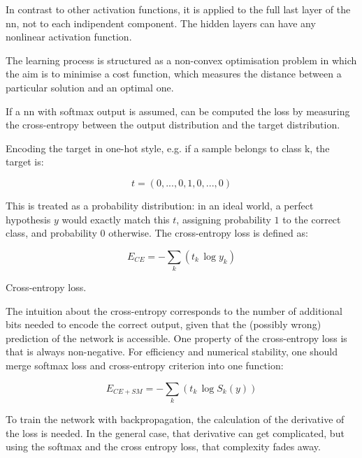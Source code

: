 \noindent In contrast to other activation functions, it is applied to the full last layer of the \gls{nn}, not to each indipendent component. The hidden layers can have any nonlinear activation function.

\noindent The learning process is structured as a non-convex optimisation problem in which the aim is to minimise a cost function, which measures the distance between a particular solution and an optimal one.

\noindent If a \gls{nn} with softmax output is assumed, can be computed the loss by measuring the cross-entropy between the output distribution and the target distribution.

\noindent Encoding the target in one-hot style, e.g. if a sample belongs to class k, the target is:

\begin{Equation}[H]
	\centering
	\begin{equation} \label{eq:nnclass3}
		t=(0,...,0,1,0,...,0)
	\end{equation}
\end{Equation}

\noindent This is treated as a probability distribution: in an ideal world, a perfect hypothesis $y$ would exactly match this $t$, assigning probability $1$ to the correct class, and probability $0$ otherwise. The cross-entropy loss is defined as:

\begin{Equation}[H]
	\centering
	\begin{equation} \label{eq:cross-entropy}
		E_{CE} = -\sum_{k}(t_k \, \log y_k)
	\end{equation}
	\caption[Cross-entropy loss.]{Cross-entropy loss.}
\end{Equation}

\noindent The intuition about the cross-entropy corresponds to the number of additional bits needed to encode the correct output, given that the (possibly wrong) prediction of the network is accessible. One property of the cross-entropy loss is that is always non-negative. For efficiency and numerical stability, one should merge softmax loss and cross-entropy criterion into one function:

\begin{Equation}[H]
	\centering
	\begin{equation}
		E_{CE+SM} = -\sum_{k}(t_k \, \log S_k(y))
	\end{equation}
	\caption[Softmax cross entropy.]{To train the network with backpropagation, the calculation of the derivative of the loss is needed. In the general case, that derivative can get complicated, but using the softmax and the cross entropy loss, that complexity fades away.}
	\label{eq:softmaxcrossentr}
\end{Equation}

